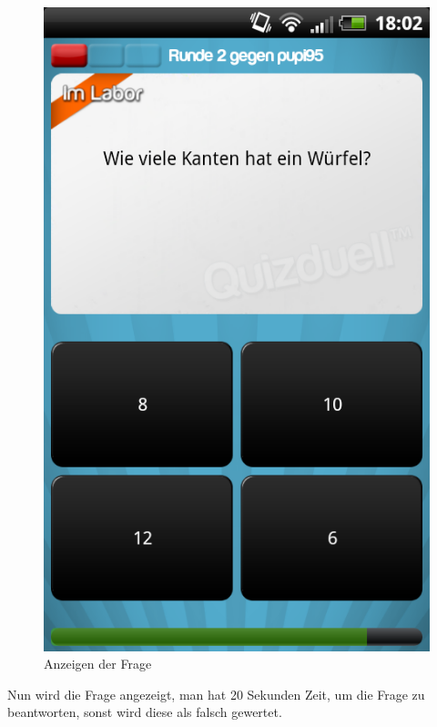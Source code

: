 \documentclass[fontsize=12pt,paper=a4,twoside]{scrartcl}
\begin{document}
\begin{figure}[H]
\centering
\includegraphics[scale=0.5]{Bilder/frage.png}
\caption{Anzeigen der Frage}
\end{figure}

Nun wird die Frage angezeigt, man hat 20 Sekunden Zeit, um die Frage zu beantworten, sonst wird diese als falsch gewertet.\\
\end{document}
